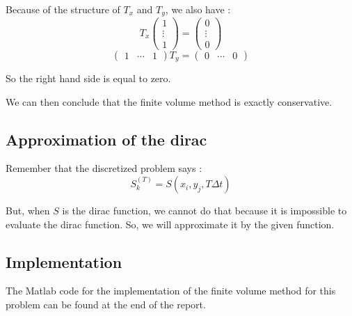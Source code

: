 Because of the structure of $T_x$ and $T_y$, we also have :
$$T_x \left(\begin{array}{c}
1 \\ 
\vdots \\ 
1
\end{array}\right)=\left(\begin{array}{c}
0 \\ 
\vdots \\ 
0
\end{array}\right)$$
$$\left(\begin{array}{ccc}
1 & \cdots & 1
\end{array}\right)T_y=\left(\begin{array}{ccc}
0 & \cdots & 0
\end{array}\right)$$

So the right hand side is equal to zero.

We can then conclude that the finite volume method is exactly conservative.


\subsection{Approximation of the dirac}
Remember that the discretized problem says : 
$$S_k^{(T)} = S(x_i,y_j,T\Delta t)$$

But, when $S$ is the dirac function, we cannot do that because it is impossible to evaluate the dirac function. So, we will approximate it by the given function.

\subsection{Implementation}
The Matlab code for the implementation of the finite volume method for this problem can be found at the end of the report.

